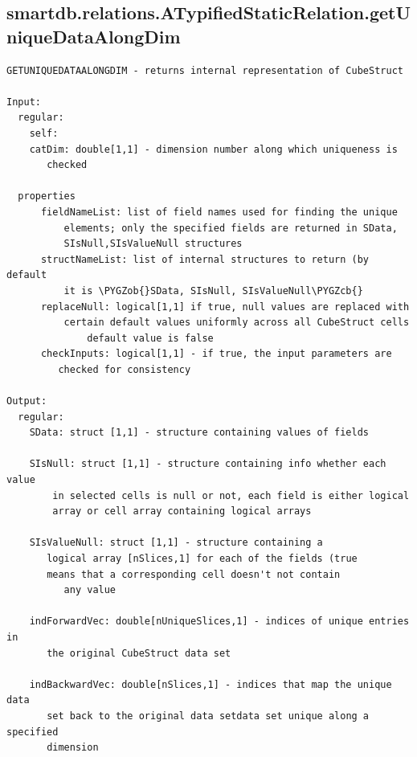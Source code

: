 \documentclass[letterpaper,10pt,english]{sphinxmanual}
\def\PYGZob{\char`\{}
\def\PYGZcb{\char`\}}
\begin{document}
\subsection{smartdb.relations.ATypifiedStaticRelation.getUniqueDataAlongDim}
\label{chap_functions:smartdb-relations-atypifiedstaticrelation-getuniquedataalongdim}
\begin{Verbatim}[commandchars=\\\{\}]
GETUNIQUEDATAALONGDIM - returns internal representation of CubeStruct

Input:
  regular:
    self:
    catDim: double[1,1] - dimension number along which uniqueness is
       checked

  properties
      fieldNameList: list of field names used for finding the unique
          elements; only the specified fields are returned in SData,
          SIsNull,SIsValueNull structures
      structNameList: list of internal structures to return (by default
          it is \PYGZob{}SData, SIsNull, SIsValueNull\PYGZcb{}
      replaceNull: logical[1,1] if true, null values are replaced with
          certain default values uniformly across all CubeStruct cells
              default value is false
      checkInputs: logical[1,1] - if true, the input parameters are
         checked for consistency

Output:
  regular:
    SData: struct [1,1] - structure containing values of fields

    SIsNull: struct [1,1] - structure containing info whether each value
        in selected cells is null or not, each field is either logical
        array or cell array containing logical arrays

    SIsValueNull: struct [1,1] - structure containing a
       logical array [nSlices,1] for each of the fields (true
       means that a corresponding cell doesn't not contain
          any value

    indForwardVec: double[nUniqueSlices,1] - indices of unique entries in
       the original CubeStruct data set

    indBackwardVec: double[nSlices,1] - indices that map the unique data
       set back to the original data setdata set unique along a specified
       dimension
\end{Verbatim}
\end{document}
